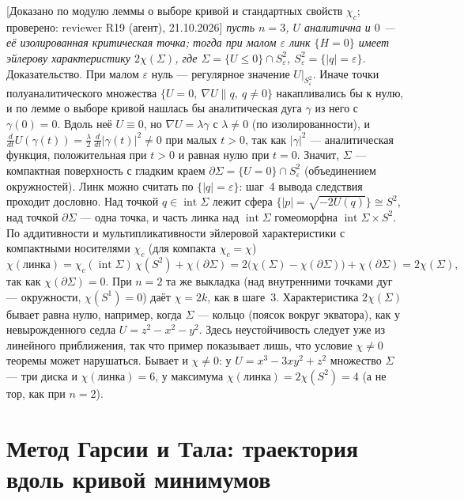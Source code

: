\documentclass[11pt,a4paper]{article}
\theoremstyle{definition}
\newcommand{\eps}{\varepsilon}
\newcommand{\mk}[1]{\textsf{[#1]}}
\begin{document}
\mk{Доказано по модулю леммы о выборе кривой и стандартных свойств $\chi_c$; проверено: reviewer R19
(агент), 21.10.2026} \emph{пусть $n=3$, $U$ аналитична и $0$ --- её изолированная критическая точка; тогда при
малом $\eps$ линк $\{H=0\}$ имеет эйлерову характеристику $2\chi(\Sigma)$, где
$\Sigma=\{U\le0\}\cap S^2_\eps$, $S^2_\eps=\{|q|=\eps\}$.} Доказательство. При малом $\eps$ нуль ---
регулярное значение $U|_{S^2_\eps}$. Иначе точки полуаналитического множества
$\{U=0,\ \nabla U\parallel q,\ q\ne0\}$ накапливались бы к нулю, и по лемме о выборе кривой нашлась бы
аналитическая дуга $\gamma$ из него с $\gamma(0)=0$. Вдоль неё $U\equiv0$, но $\nabla U=\lambda\gamma$ с
$\lambda\ne0$ (по изолированности), и
$\frac{d}{dt}U(\gamma(t))=\frac\lambda2\,\frac{d}{dt}|\gamma(t)|^2\ne0$ при малых $t>0$, так как $|\gamma|^2$ ---
аналитическая функция, положительная при $t>0$ и равная нулю при $t=0$. Значит, $\Sigma$ ---
компактная поверхность с гладким краем $\partial\Sigma=\{U=0\}\cap S^2_\eps$ (объединением окружностей).
Линк можно считать по $\{|q|=\eps\}$: шаг~4 вывода следствия проходит дословно. Над точкой
$q\in\operatorname{int}\Sigma$ лежит сфера $\{|p|=\sqrt{-2U(q)}\}\cong S^2$, над точкой $\partial\Sigma$ ---
одна точка, и часть линка над $\operatorname{int}\Sigma$ гомеоморфна $\operatorname{int}\Sigma\times S^2$. По
аддитивности и мультипликативности эйлеровой характеристики с компактными носителями $\chi_c$ (для
компакта $\chi_c=\chi$)
\[
\chi(\text{линка})=\chi_c(\operatorname{int}\Sigma)\,\chi(S^2)+\chi(\partial\Sigma)
=2\bigl(\chi(\Sigma)-\chi(\partial\Sigma)\bigr)+\chi(\partial\Sigma)=2\chi(\Sigma),
\]
так как $\chi(\partial\Sigma)=0$. При $n=2$ та же выкладка (над внутренними точками дуг ---
окружности, $\chi(S^1)=0$) даёт $\chi=2k$, как в шаге~3. Характеристика $2\chi(\Sigma)$ бывает равна нулю,
например, когда $\Sigma$ --- кольцо (поясок вокруг экватора), как у невырожденного седла
$U=z^2-x^2-y^2$. Здесь неустойчивость следует уже из линейного приближения, так что пример
показывает лишь, что условие $\chi\ne0$ теоремы может нарушаться. Бывает и $\chi\ne0$: у
$U=x^3-3xy^2+z^2$ множество $\Sigma$ --- три диска и $\chi(\text{линка})=6$, у максимума
$\chi(\text{линка})=2\chi(S^2)=4$ (а не тор, как при $n=2$).

\section{Метод Гарсии и Тала: траектория вдоль кривой минимумов}\label{sec:garcia-tal}
\end{document}
